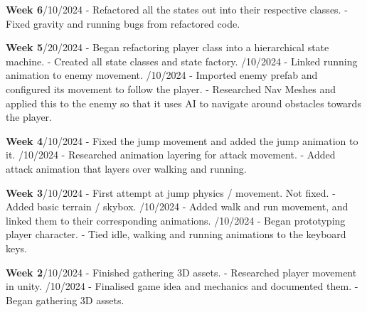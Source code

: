 \documentclass[10pt]{final_report}
\begin{document}
\textbf{Week 6}/10/2024
\newline- Refactored all the states out into their respective classes.
\newline- Fixed gravity and running bugs from refactored code.

\textbf{Week 5}/20/2024
\newline- Began refactoring player class into a hierarchical state machine.
\newline- Created all state classes and state factory.
/10/2024
\newline- Linked running animation to enemy movement.
/10/2024
\newline- Imported enemy prefab and configured its movement to follow the player.
\newline- Researched Nav Meshes and applied this to the enemy so that it uses AI to navigate around obstacles towards the player.

\textbf{Week 4}/10/2024
\newline- Fixed the jump movement and added the jump animation to it.
/10/2024
\newline- Researched animation layering for attack movement.
\newline- Added attack animation that layers over walking and running.

\textbf{Week 3}/10/2024
\newline- First attempt at jump physics / movement. Not fixed.
\newline- Added basic terrain / skybox.
/10/2024
\newline- Added walk and run movement, and linked them to their corresponding animations.
/10/2024
\newline- Began prototyping player character.
\newline- Tied idle, walking and running animations to the keyboard keys.

\textbf{Week 2}/10/2024
\newline- Finished gathering 3D assets.
\newline- Researched player movement in unity.
/10/2024
\newline- Finalised game idea and mechanics and documented them.
\newline- Began gathering 3D assets.
\end{document}
